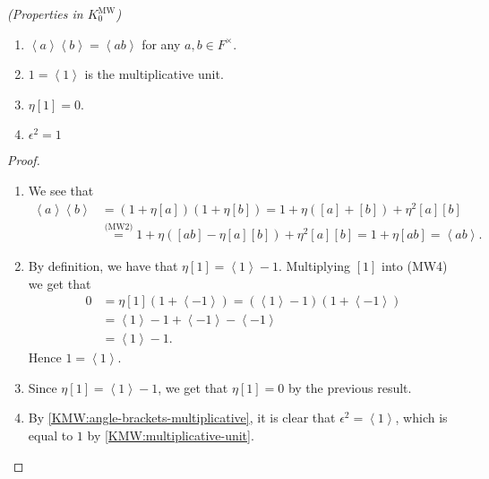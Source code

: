 \documentclass[11pt,openany]{book}
\providecommand{\MW}{\mathrm{MW}}
\begin{document}
\begin{proposition}\label{prop:properties-KMW0} 
\textit{(Properties in $K_0^\MW$)}
\begin{enumerate}
    \item\label{KMW:angle-brackets-multiplicative}
    $\left\langle a \right\rangle \left\langle b \right\rangle = \left\langle ab \right\rangle$ for any $a,b \in F^\times$.
    \item\label{KMW:multiplicative-unit}
    $1 = \left\langle 1 \right\rangle$ is the multiplicative unit.
    \item\label{KMW:bracket-1}
    $\eta[1] = 0$.
    \item\label{KMW:epsilon-squared}
    $\epsilon^2 = 1$
\end{enumerate}
\end{proposition}
\begin{proof} $\ $
\begin{enumerate}
    \item We see that
    \begin{align*}
    \left\langle a \right\rangle \left\langle b  \right\rangle &= \left( 1 + \eta[a] \right) \left( 1 + \eta[b] \right) = 1 + \eta([a]+[b]) + \eta^2[a][b] \\
    &\overset{\text{(MW2)}}{=} 1 + \eta \left( [ab] - \eta [a][b] \right) + \eta^2[a][b] = 1 + \eta[ab] = \left\langle ab \right\rangle.
\end{align*}
    \item By definition, we have that $\eta[1] = \left\langle 1 \right\rangle - 1$. Multiplying $[1]$ into (MW4) we get that
\begin{align*}
    0 &= \eta[1] (1 + \left\langle -1 \right\rangle) = \left( \left\langle 1 \right\rangle - 1 \right) \left( 1 + \left\langle -1 \right\rangle \right) \\
    &= \left\langle 1 \right\rangle - 1 + \left\langle -1 \right\rangle - \left\langle -1 \right\rangle \\
    &= \left\langle 1 \right\rangle - 1.
\end{align*}
Hence $1 = \left\langle 1 \right\rangle$.

    \item Since $\eta[1] = \left\langle 1 \right\rangle - 1$, we get that $\eta[1] = 0$ by the previous result.

    \item By \ref{KMW:angle-brackets-multiplicative}, it is clear that $\epsilon^2 = \left\langle 1 \right\rangle$, which is equal to $1$ by \ref{KMW:multiplicative-unit}.
\end{enumerate}
\end{proof}
\end{document}
